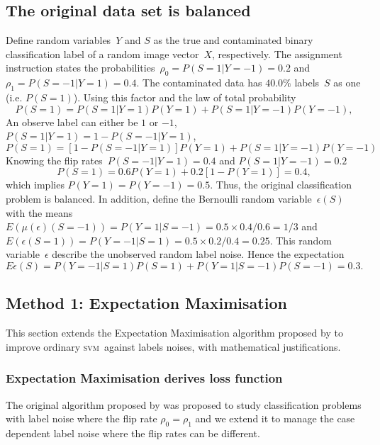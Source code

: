 \documentclass[12pt]{article} %
\newcommand{\svm}{\textsc{svm}}
\begin{document}
\subsection{The original data set is balanced} \label{sec:1}
Define random variables~$Y$ and $S$ as the true and contaminated binary classification label of a random image vector~$X$, respectively. The assignment instruction states the probabilities~$\rho_0=P(S=1|Y=-1)=0.2$ and $\rho_1=P(S=-1|Y=1)=0.4$.
The contaminated data has $40.0\%$ labels~$S$ as one (i.e. $P(S=1)$). Using this factor and the law of total probability
\begin{equation*}
P(S=1)=P(S=1|Y=1)P(Y=1)+P(S=1|Y=-1)P(Y=-1),
\end{equation*}
An observe label can either be $1$ or $-1$, $P(S=1|Y=1)=1-P(S=-1|Y=1)$,
\begin{equation*}
P(S=1)=\left[1-P(S=-1|Y=1)\right]P(Y=1)+P(S=1|Y=-1)P(Y=-1)
\end{equation*}
Knowing the flip rates~$P(S=-1|Y=1)=0.4$ and $P(S=1|Y=-1)=0.2$
\begin{equation*}
P(S=1)=0.6P(Y=1)+0.2\left[1-P(Y=1)\right]=0.4, \nonumber
\end{equation*}
which implies $P(Y=1)=P(Y=-1)=0.5$. Thus, the original classification problem is balanced. 
In addition, define the Bernoulli random variable~$\epsilon(S)$ with the means $E(\mu(\epsilon)(S=-1))=P(Y=1|S=-1)=0.5\times0.4/0.6=1/3$ and $E(\epsilon(S=1))=P(Y=-1|S=1)=0.5\times0.2/0.4=0.25$. This random variable~$\epsilon$ describe the unobserved random label noise. Hence the expectation
\begin{equation}
    E\epsilon(S)=P(Y=-1|S=1)P(S=1)+P(Y=1|S=-1)P(S=-1)
    =0.3.\label{eq:exp}
\end{equation}
\subsection{Method 1: Expectation Maximisation}\label{1st}
This section extends the Expectation Maximisation algorithm proposed by \citet{pmlr-v20-biggio11} to improve ordinary \svm\ against labels noises, with mathematical justifications.
\subsubsection{Expectation Maximisation derives loss function}
The original algorithm proposed by \citet{pmlr-v20-biggio11} was proposed to study classification problems with label noise where the flip rate $\rho_0=\rho_1$ and we extend it to manage the case dependent label noise where the flip rates can be different.
\end{document}
